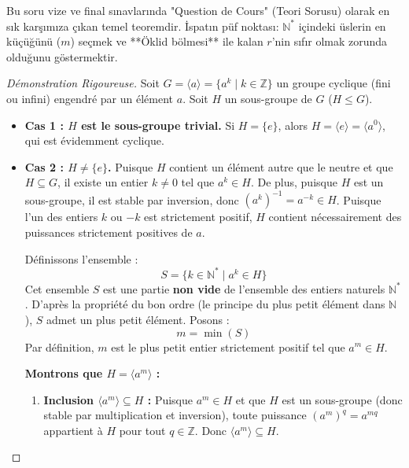 \documentclass[12pt,a4paper]{report}
\begin{document}
\begin{tcolorbox}[colback=yellow!5!white,colframe=orange!80!black,title=Sınav İpucu : Sınavlarda En Çok Çıkan Teori İspatı !]
Bu soru vize ve final sınavlarında "Question de Cours" (Teori Sorusu) olarak en sık karşımıza çıkan temel teoremdir. İspatın püf noktası: $\mathbb{N}^*$ içindeki üslerin en küçüğünü ($m$) seçmek ve **Öklid bölmesi** ile kalan $r$'nin sıfır olmak zorunda olduğunu göstermektir.
\end{tcolorbox}

\begin{proof}[Démonstration Rigoureuse]
Soit $G = \langle a \rangle = \{ a^k \mid k \in \mathbb{Z} \}$ un groupe cyclique (fini ou infini) engendré par un élément $a$.
Soit $H$ un sous-groupe de $G$ ($H \leq G$).

\begin{itemize}
    \item \textbf{Cas 1 : $H$ est le sous-groupe trivial.}  
    Si $H = \{e\}$, alors $H = \langle e \rangle = \langle a^0 \rangle$, qui est évidemment cyclique.
    
    \item \textbf{Cas 2 : $H \neq \{e\}$.}  
    Puisque $H$ contient un élément autre que le neutre et que $H \subseteq G$, il existe un entier $k \neq 0$ tel que $a^k \in H$.  
    De plus, puisque $H$ est un sous-groupe, il est stable par inversion, donc $(a^k)^{-1} = a^{-k} \in H$.  
    Puisque l'un des entiers $k$ ou $-k$ est strictement positif, $H$ contient nécessairement des puissances strictement positives de $a$.
    
    Définissons l'ensemble :
    \[ S = \{ k \in \mathbb{N}^* \mid a^k \in H \} \]
    Cet ensemble $S$ est une partie \textbf{non vide} de l'ensemble des entiers naturels $\mathbb{N}^*$.  
    D'après la propriété du bon ordre (le principe du plus petit élément dans $\mathbb{N}$), $S$ admet un plus petit élément.  
    Posons :
    \[ m = \min(S) \]
    Par définition, $m$ est le plus petit entier strictement positif tel que $a^m \in H$.
    
    \textbf{Montrons que $H = \langle a^m \rangle$ :}
    \begin{enumerate}
        \item \textbf{Inclusion $\langle a^m \rangle \subseteq H$ :}  
        Puisque $a^m \in H$ et que $H$ est un sous-groupe (donc stable par multiplication et inversion), toute puissance $(a^m)^q = a^{mq}$ appartient à $H$ pour tout $q \in \mathbb{Z}$. Donc $\langle a^m \rangle \subseteq H$.
        

\end{enumerate}
\end{itemize}
\end{proof}
\end{document}
